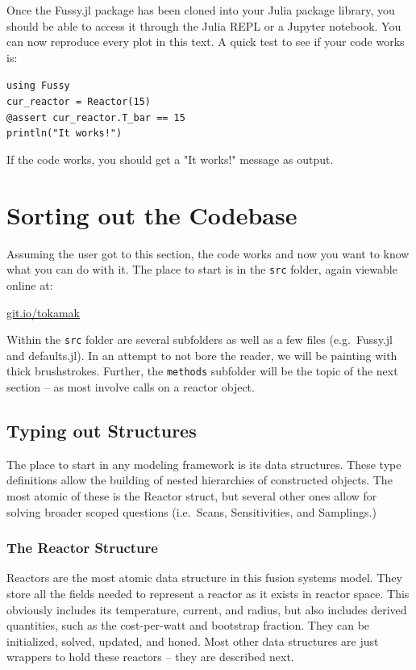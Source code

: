 Once the Fussy.jl package has been cloned into your Julia package library, you should be able to access it through the Julia REPL or a Jupyter notebook. You can now reproduce every plot in this text. A quick test to see if your code works is:
\begin{addmargin}[1.5em]{1.5em}
\texttt{using Fussy \\
cur\_reactor = Reactor(15) \\
@assert cur\_reactor.T\_bar == 15 \\
println("It works!")
}
\end{addmargin}

If the code works, you should get a "It works!" message as output.

\section{Sorting out the Codebase}

Assuming the user got to this section, the code works and now you want to know what you can do with it. The place to start is in the \texttt{src} folder, again viewable online at:

{\centering \href{http://git.io/tokamak}{git.io/tokamak} \par }

Within the \texttt{src} folder are several subfolders as well as a few files (e.g.\ Fussy.jl and defaults.jl). In an attempt to not bore the reader, we will be painting with thick brushstrokes. Further, the \texttt{methods} subfolder will be the topic of the next section -- as most involve calls on a reactor object.

\subsection{Typing out Structures}

The place to start in any modeling framework is its data structures. These type definitions allow the building of nested hierarchies of constructed objects. The most atomic of these is the Reactor struct, but several other ones allow for solving broader scoped questions (i.e.\ Scans, Sensitivities, and Samplings.)

\subsubsection{The Reactor Structure}

Reactors are the most atomic data structure in this fusion systems model. They store all the fields needed to represent a reactor as it exists in reactor space. This obviously includes its temperature, current, and radius, but also includes derived quantities, such as the cost-per-watt and bootstrap fraction. They can be initialized, solved, updated, and honed. Most other data structures are just wrappers to hold these reactors -- they are described next.

